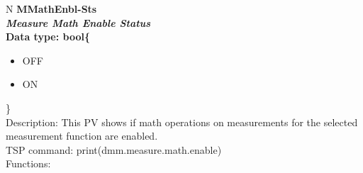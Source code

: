 \documentclass[openany]{article}
\begin{document}
		\begin{tabular}{N}
			\hline
			\bfseries MMathEnbl-Sts\label{pv:mmathenbl-sts} \\ \hline
			\emph{Measure Math Enable Status} \\
			Data type: bool\{\begin{itemize}[noitemsep]
				\small
				\item[] OFF
				\item[] ON
			\end{itemize}\} \\
			Description: This PV shows if math operations on measurements for the selected measurement function are enabled. \\
			TSP command: print(dmm.measure.math.enable) \\
			Functions: \\
			\arrayrulecolor{\FuncTableBorderColor}

		\end{tabular}
\end{document}
